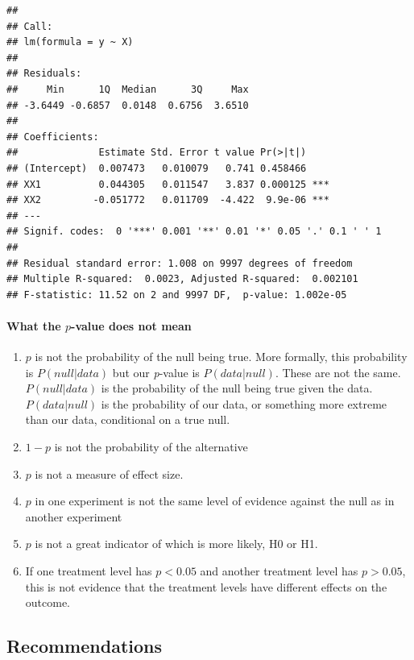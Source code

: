 \documentclass[]{book}
\providecommand{\tightlist}{%
  \setlength{\itemsep}{0pt}\setlength{\parskip}{0pt}}
\let\oldparagraph\paragraph
\renewcommand{\paragraph}[1]{\oldparagraph{#1}\mbox{}}
\begin{document}
\begin{verbatim}
## 
## Call:
## lm(formula = y ~ X)
## 
## Residuals:
##     Min      1Q  Median      3Q     Max 
## -3.6449 -0.6857  0.0148  0.6756  3.6510 
## 
## Coefficients:
##              Estimate Std. Error t value Pr(>|t|)    
## (Intercept)  0.007473   0.010079   0.741 0.458466    
## XX1          0.044305   0.011547   3.837 0.000125 ***
## XX2         -0.051772   0.011709  -4.422  9.9e-06 ***
## ---
## Signif. codes:  0 '***' 0.001 '**' 0.01 '*' 0.05 '.' 0.1 ' ' 1
## 
## Residual standard error: 1.008 on 9997 degrees of freedom
## Multiple R-squared:  0.0023, Adjusted R-squared:  0.002101 
## F-statistic: 11.52 on 2 and 9997 DF,  p-value: 1.002e-05
\end{verbatim}

\paragraph{\texorpdfstring{What the \(p\)-value does not
mean}{What the p-value does not mean}}\label{what-the-p-value-does-not-mean}

\begin{enumerate}
\def\labelenumi{\arabic{enumi}.}
\tightlist
\item
  \(p\) is not the probability of the null being true. More formally,
  this probability is \(P(null | data)\) but our \emph{p}-value is
  \(P(data | null)\). These are not the same. \(P(null | data)\) is the
  probability of the null being true given the data. \(P(data | null)\)
  is the probability of our data, or something more extreme than our
  data, conditional on a true null.
\item
  \(1-p\) is not the probability of the alternative
\item
  \(p\) is not a measure of effect size.
\item
  \(p\) in one experiment is not the same level of evidence against the
  null as in another experiment
\item
  \(p\) is not a great indicator of which is more likely, H0 or H1.
\item
  If one treatment level has \(p < 0.05\) and another treatment level
  has \(p > 0.05\), this is not evidence that the treatment levels have
  different effects on the outcome.
\end{enumerate}

\subsection{Recommendations}\label{recommendations}
\end{document}
